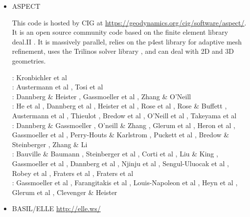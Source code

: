 \begin{itemize}
\item {\codefont ASPECT} 

This code is hosted by CIG at \url{https://geodynamics.org/cig/software/aspect/}. 
It is an open source community code based on the finite element library deal.II \cite{bahk07,arbc19,arbd20}. 
It is massively parallel, relies on the p4est library for adaptive mesh refinement,
uses the Trilinos solver library \cite{hewi12}, and can deal with 2D and 3D geometries. 

\begin{scriptsize}
\noindent
\twothousandtwelve:
Kronbichler et al \cite{krhb12}\\
\twothousandfifteen:
Austermann et al \cite{aupm15}, Tosi et al \cite{tosn15}\\
\twothousandsixteen:
Dannberg \& Heister \cite{dahe16}, Gassmoeller et al \cite{gadb16}, Zhang \& O'Neill \cite{zhon16}\\
\twothousandseventeen:
He et al \cite{hepb17}, Dannberg et al \cite{daef17}, Heister et al \cite{hedg17},
Rose et al \cite{robh17}, Rose \& Buffett \cite{robu17}, Austermann et al \cite{aumh17},
Thieulot \cite{thie17}, Bredow et al \cite{brsg17}, O'Neill et al \cite{onmz17},
Takeyama et al \cite{tasm17}\\
\twothousandeighteen:
Dannberg \& Gassmoeller \cite{daga18}, O'neill \& Zhang \cite{onzh18}, 
Glerum et al \cite{gltf18}, Heron et al \cite{heps18}, Gassmoeller et al \cite{galh18}, 
Perry-Houts \& Karlstrom \cite{peka18}, Puckett et al \cite{puth18},
Bredow \& Steinberger \cite{brst18b}, Zhang \& Li \cite{zhli18}\\
\twothousandnineteen:
Bauville \& Baumann \cite{baba19}, Steinberger et al \cite{stbl19}, Corti et al \cite{cocf19},
Liu \& King \cite{liki19}, Gassmoeller et al \cite{galb19}, Dannberg et al \cite{dagg19},
Njinju et al \cite{njas19}, Sengul-Uluocak et al \cite{sepg19}, Robey et al \cite{ropu19},
Fraters et al \cite{frtv19}, Fraters et al \cite{frbt19}\\
\twothousandtwenty:
Gassmoeller et al \cite{gadb20}, Farangitakis et al \cite{fahm20}, 
Louis-Napoleon et al \cite{logb20}, Heyn et al \cite{hect20}, Glerum et al \cite{glbs20},
Clevenger \& Heister \cite{clhe20}
\end{scriptsize}

\item {\codefont BASIL/ELLE} \url{http://elle.ws/}


\end{itemize}
